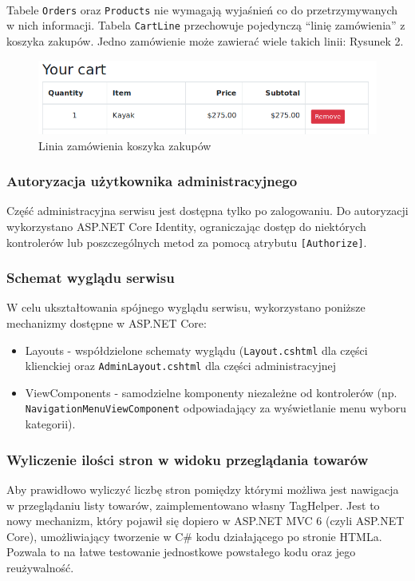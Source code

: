 \documentclass[a4paper,10pt]{article}
\begin{document}
\paragraph{}
Tabele \texttt{Orders} oraz \texttt{Products} nie wymagają wyjaśnień co do przetrzymywanych w nich informacji. Tabela \texttt{CartLine}  przechowuje pojedynczą ``linię zamówienia'' z koszyka zakupów. Jedno zamówienie może zawierać wiele takich linii: Rysunek 2.
\begin{figure}
 \centering
 \includegraphics[width=\linewidth]{Images/lineCart.png}
 \caption{Linia zamówienia koszyka zakupów}
 \label{rys:}
\end{figure}


\subsubsection{Autoryzacja użytkownika administracyjnego}
Część administracyjna serwisu jest dostępna tylko po zalogowaniu. Do autoryzacji wykorzystano ASP.NET Core Identity, ograniczając dostęp do niektórych kontrolerów lub poszczególnych metod za pomocą atrybutu \texttt{[Authorize]}.

\subsubsection{Schemat wyglądu serwisu}
W celu ukształtowania spójnego wyglądu serwisu, wykorzystano poniższe mechanizmy dostępne w ASP.NET Core:
\begin{itemize}
  \item Layouts - współdzielone schematy wyglądu (\texttt{Layout.cshtml} dla części klienckiej oraz \texttt{AdminLayout.cshtml} dla części administracyjnej
 \item ViewComponents - samodzielne komponenty niezależne od kontrolerów (np. \texttt{NavigationMenuViewComponent} odpowiadający za wyświetlanie menu wyboru kategorii).
\end{itemize}
 

\subsubsection{Wyliczenie ilości stron w widoku przeglądania towarów}
Aby prawidłowo wyliczyć liczbę stron pomiędzy którymi możliwa jest nawigacja w przeglądaniu listy towarów, zaimplementowano własny TagHelper. Jest to nowy mechanizm, który pojawił się dopiero w ASP.NET MVC 6 (czyli ASP.NET Core), umożliwiający tworzenie w C\# kodu działającego po stronie HTMLa. Pozwala to na łatwe testowanie jednostkowe powstałego kodu oraz jego reużywalność.
\end{document}
